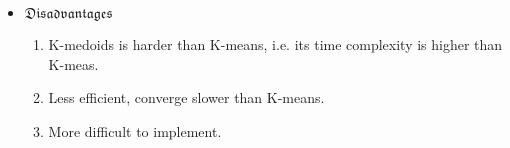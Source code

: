\documentclass[a4paper, 10pt, titlepage]{article}
\begin{document}
\begin{enumerate}
\begin{itemize}
\begin{enumerate}
        \end{enumerate}
    \item $\mathfrak{Disadvantages}$
        \begin{enumerate}
            \item K-medoids is harder than K-means, i.e. its time complexity is higher than K-meas.
            \item Less efficient, converge slower than K-means.
            \item More difficult to implement. 

        \end{enumerate}
\end{itemize}
    
                    


                
\end{enumerate}
\end{document}
